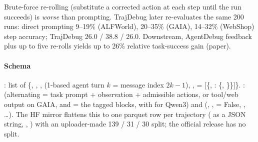 \begin{center}\footnotesize\setlength{\tabcolsep}{2.5pt}
\end{center}
Brute-force re-rolling (substitute a corrected action at each step until the run succeeds) is \emph{worse} than prompting. TrajDebug later re-evaluates the same 200 runs: direct prompting 9--19\% (ALFWorld), 20--35\% (GAIA), 14--32\% (WebShop) step accuracy; TrajDebug 26.0 / 38.8 / 26.0. Downstream, AgentDebug feedback plus up to five re-rolls yields up to 26\% relative task-success gain (paper).

\paragraph{Schema} : list of \{, , ,  (1-based agent turn $k$ = message index $2k{-}1$), ,  = [\{, : \{, \}\}]\}. :  (alternating  = task prompt + observation + admissible actions, or tool/web output on GAIA, and  = the tagged blocks, with  for Qwen3) and  (, ,  = False, , \dots). The HF mirror flattens this to one parquet row per trajectory ( as a JSON string, , ) with an uploader-made 139 / 31 / 30 split; the official release has no split.

